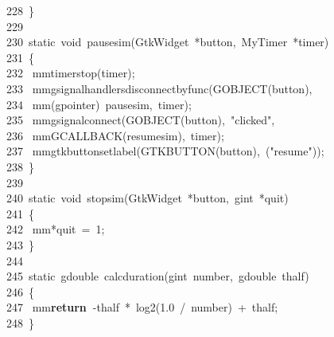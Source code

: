 \documentclass[10pt,a4paper]{article}
\newcommand{\hlstd}[1]{\textcolor[rgb]{0,0,0}{#1}}
\newcommand{\hlkey}[1]{\textcolor[rgb]{0,0,0}{\bf{#1}}}
\newcommand{\hlnum}[1]{\textcolor[rgb]{0.16,0.16,1}{#1}}
\newcommand{\hltyp}[1]{\textcolor[rgb]{0.51,0,0}{#1}}
\newcommand{\hlstr}[1]{\textcolor[rgb]{1,0,0}{#1}}
\newcommand{\hlline}[1]{\textcolor[rgb]{0.33,0.33,0.33}{#1}}
\begin{document}
{}\hlline{\ 228\ }\hlstd{\}\mbox{}\\
}\hlline{\ 229\ }\hlstd{\mbox{}\\
}\hlline{\ 230\ }\hlstd{}\hltyp{static\ void\ }\hlstd{pause\textunderscore sim(GtkWidget\ *button,\ MyTimer\ *timer)\mbox{}\\
}\hlline{\ 231\ }\hlstd{\{\mbox{}\\
}\hlline{\ 232\ }\hlstd{\hlstd{ mm}timer\textunderscore stop(timer);\mbox{}\\
}\hlline{\ 233\ }\hlstd{\hlstd{ mm}g\textunderscore signal\textunderscore handlers\textunderscore disconnect\textunderscore by\textunderscore func(G\textunderscore OBJECT(button),\mbox{}\\
}\hlline{\ 234\ }\hlstd{\hlstd{ mm}(gpointer)\ pause\textunderscore sim,\ timer);\mbox{}\\
}\hlline{\ 235\ }\hlstd{\hlstd{ mm}g\textunderscore signal\textunderscore connect(G\textunderscore OBJECT(button),\ }\hlstr{"clicked"}\hlstd{,\mbox{}\\
}\hlline{\ 236\ }\hlstd{\hlstd{ mm}G\textunderscore CALLBACK(resume\textunderscore sim),\ timer);\mbox{}\\
}\hlline{\ 237\ }\hlstd{\hlstd{ mm}gtk\textunderscore button\textunderscore set\textunderscore label(GTK\textunderscore BUTTON(button),\ \textunderscore (}\hlstr{"resume"}\hlstd{));\mbox{}\\
}\hlline{\ 238\ }\hlstd{\}\mbox{}\\
}\hlline{\ 239\ }\hlstd{\mbox{}\\
}\hlline{\ 240\ }\hlstd{}\hltyp{static\ void\ }\hlstd{stop\textunderscore sim(GtkWidget\ *button,\ gint\ *quit)\mbox{}\\
}\hlline{\ 241\ }\hlstd{\{\mbox{}\\
}\hlline{\ 242\ }\hlstd{\hlstd{ mm}*quit\ =\ }\hlnum{1}\hlstd{;\mbox{}\\
}\hlline{\ 243\ }\hlstd{\}\mbox{}\\
}\hlline{\ 244\ }\hlstd{\mbox{}\\
}\hlline{\ 245\ }\hlstd{}\hltyp{static\ }\hlstd{gdouble\ calc\textunderscore duration(gint\ number,\ gdouble\ thalf)\mbox{}\\
}\hlline{\ 246\ }\hlstd{\{\mbox{}\\
}\hlline{\ 247\ }\hlstd{\hlstd{ mm}}\hlkey{return\ }\hlstd{-thalf\ *\ log2(}\hlnum{1.0\ }\hlstd{/\ number)\ +\ thalf;\mbox{}\\
}\hlline{\ 248\ }\hlstd{\}\mbox{}\\
}
\end{document}
